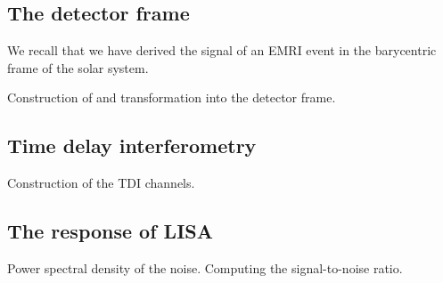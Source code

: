 \subsection{The detector frame}
We recall that we have derived the signal of an EMRI event in the barycentric frame of the solar system.



Construction of and transformation into the detector frame.

\subsection{Time delay interferometry}

Construction of the TDI channels.

\subsection{The response of LISA}

Power spectral density of the noise.
Computing the signal-to-noise ratio.


